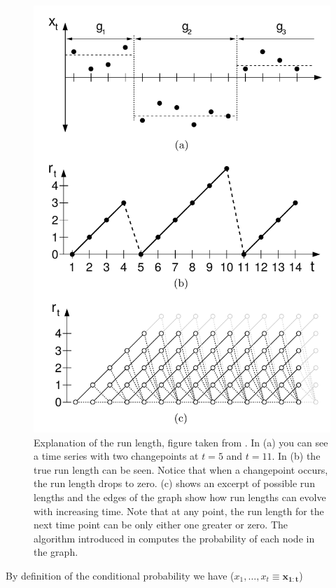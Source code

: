 \documentclass[12pt,a4paper]{article}
\begin{document}
\begin{figure}
	\centering
	\includegraphics{images/runlength_example.png}
	\caption{Explanation of the run length, figure taken from \cite{Adams:BayesianOnlineChangepoint}. In (a) you can see a time series with two changepoints at $t=5$ and $t=11$. In (b) the true run length can be seen. Notice that when a changepoint occurs, the run length drops to zero. (c) shows an excerpt of possible run lengths and the edges of the graph show how run lengths can evolve with increasing time. Note that at any point, the run length for the next time point can be only either one greater or zero. The algorithm introduced in \cite{Adams:BayesianOnlineChangepoint} computes the probability of each node in the graph.}
	\label{fig:runlength_example}
\end{figure}

By definition of the conditional probability we have ($x_1,\dots,x_t \equiv \bm{{ x_{1:t}}}$)
\end{document}
